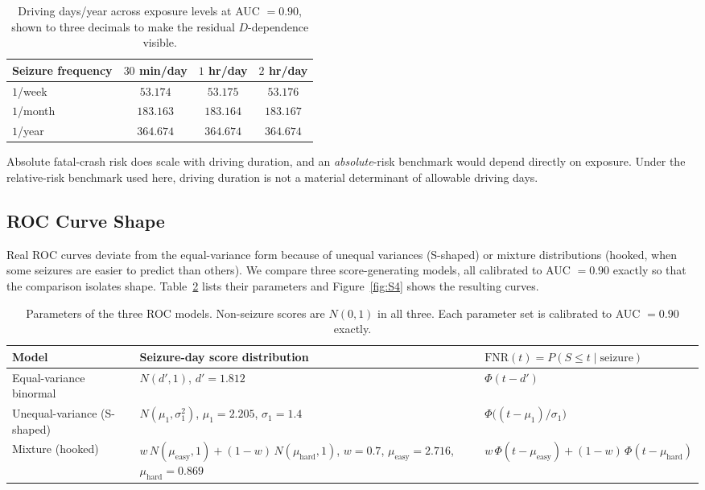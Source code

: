 \documentclass[11pt]{article}
\numberwithin{equation}{section}
\begin{document}
\begin{table}[htbp]
\caption{Driving days/year across exposure levels at AUC $=0.90$, shown to three
decimals to make the residual $D$-dependence visible.}
\label{tab:duration}
\centering
\begin{tabular}{lccc}
\toprule
Seizure frequency & $30$ min/day & $1$ hr/day & $2$ hr/day \\
\midrule
$1$/week  & $53.174$  & $53.175$  & $53.176$  \\
$1$/month & $183.163$ & $183.164$ & $183.167$ \\
$1$/year  & $364.674$ & $364.674$ & $364.674$ \\
\bottomrule
\end{tabular}
\end{table}

Absolute fatal-crash risk does scale with driving duration, and an
\emph{absolute}-risk benchmark would depend directly on exposure. Under the
relative-risk benchmark used here, driving duration is not a material determinant of
allowable driving days.

\subsection{ROC Curve Shape}
\label{sec:roc-shape}

Real ROC curves deviate from the equal-variance form because of unequal variances
(S-shaped) or mixture distributions (hooked, when some seizures are easier to predict
than others). We compare three score-generating models, all calibrated to AUC $=0.90$
exactly so that the comparison isolates shape. Table~\ref{tab:roc-params} lists their
parameters and Figure~\ref{fig:S4} shows the resulting curves.

\begin{table}[htbp]
\caption{Parameters of the three ROC models. Non-seizure scores are $N(0,1)$ in all
three. Each parameter set is calibrated to AUC $=0.90$ exactly.}
\label{tab:roc-params}
\centering
\small
\renewcommand{\arraystretch}{1.2}
\begin{tabularx}{\linewidth}{l >{\raggedright\arraybackslash}X l}
\toprule
Model & Seizure-day score distribution & $\mathrm{FNR}(t) = P(S \le t \mid \text{seizure})$ \\
\midrule
Equal-variance binormal
  & $N(d', 1)$, \quad $d' = 1.812$
  & $\Phi(t - d')$ \\
Unequal-variance (S-shaped)
  & $N(\mu_1, \sigma_1^2)$, \quad $\mu_1 = 2.205$, $\sigma_1 = 1.4$
  & $\Phi\!\big((t - \mu_1)/\sigma_1\big)$ \\
Mixture (hooked)
  & $w\,N(\mu_{\text{easy}}, 1) + (1-w)\,N(\mu_{\text{hard}}, 1)$,\newline
    $w = 0.7$, $\mu_{\text{easy}} = 2.716$, $\mu_{\text{hard}} = 0.869$
  & $w\,\Phi(t - \mu_{\text{easy}}) + (1-w)\,\Phi(t - \mu_{\text{hard}})$ \\
\bottomrule
\end{tabularx}
\end{table}
\end{document}

